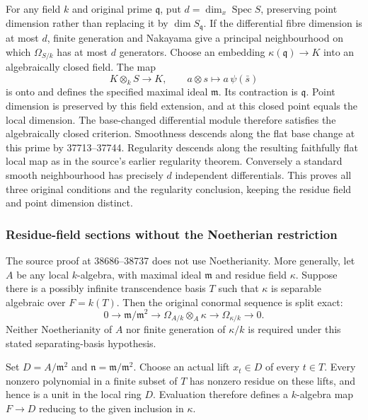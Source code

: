 For any field \(k\) and original prime \(\mathfrak q\), put \(d=\dim_x\operatorname{Spec}S\), preserving point dimension rather than replacing it by \(\dim S_{\mathfrak q}\). If the differential fibre dimension is at most \(d\), finite generation and Nakayama give a principal neighbourhood on which \(\Omega_{S/k}\) has at most \(d\) generators. Choose an embedding \(\kappa(\mathfrak q)\to K\) into an algebraically closed field. The map \[
K\otimes_kS\longrightarrow K,\qquad a\otimes s\longmapsto a\,\psi(\bar s)
\] is onto and defines the specified maximal ideal \(\mathfrak m\). Its contraction is \(\mathfrak q\). Point dimension is preserved by this field extension, and at this closed point equals the local dimension. The base-changed differential module therefore satisfies the algebraically closed criterion. Smoothness descends along the flat base change at this prime by 37713--37744. Regularity descends along the resulting faithfully flat local map as in the source's earlier regularity theorem. Conversely a standard smooth neighbourhood has precisely \(d\) independent differentials. This proves all three original conditions and the regularity conclusion, keeping the residue field and point dimension distinct.

\subsubsection{Residue-field sections without the Noetherian restriction}\label{residue-field-sections-without-the-noetherian-restriction}

The source proof at 38686--38737 does not use Noetherianity. More generally, let \(A\) be any local \(k\)-algebra, with maximal ideal \(\mathfrak m\) and residue field \(\kappa\). Suppose there is a possibly infinite transcendence basis \(T\) such that \(\kappa\) is separable algebraic over \(F=k(T)\). Then the original conormal sequence is split exact: \[
0\longrightarrow\mathfrak m/\mathfrak m^2
\longrightarrow\Omega_{A/k}\otimes_A\kappa
\longrightarrow\Omega_{\kappa/k}\longrightarrow0.
\] Neither Noetherianity of \(A\) nor finite generation of \(\kappa/k\) is required under this stated separating-basis hypothesis.

Set \(D=A/\mathfrak m^2\) and \(\mathfrak n=\mathfrak m/\mathfrak m^2\). Choose an actual lift \(x_t\in D\) of every \(t\in T\). Every nonzero polynomial in a finite subset of \(T\) has nonzero residue on these lifts, and hence is a unit in the local ring \(D\). Evaluation therefore defines a \(k\)-algebra map \(F\to D\) reducing to the given inclusion in \(\kappa\).

